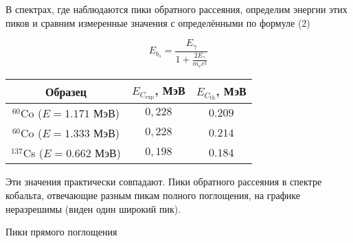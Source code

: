 В спектрах, где наблюдаются пики обратного рассеяния, определим энергии этих
пиков и сравним измеренные значения с определёнными по формуле (2)

\begin{equation}
  E_{b_s} = \frac{E_{\gamma}}{1 + \frac{2E_{\gamma}}{m_e c^2}}
\end{equation}

\begin{table}
  \begin{center}
  \begin{tabular}{| c | c | c |}
  \hline
  Образец & $E_{C_{\text{exp}}}$, МэВ & $E_{C_{\text{th}}}$, МэВ \\
  \hline
  ${}^{60}$Co ($E = 1.171$ МэВ) & $0,228$ & $0.209$ \\
  \hline
  ${}^{60}$Co ($E = 1.333$ МэВ) & $0,228$ & $0.214$ \\
  \hline
  ${}^{137}$Cs ($E = 0.662$ МэВ) & $0,198$ & $0.184$ \\
  \hline
\end{tabular}
\end{center}
\end{table}

Эти значения практически совпадают. Пики обратного рассеяния в спектре кобальта,
отвечающие разным пикам полного поглощения, на графике неразрешимы (виден один
широкий пик).

\begin{table}[h!]
  \centering
  \caption{Пики прямого поглощения}
  
\end{table}
